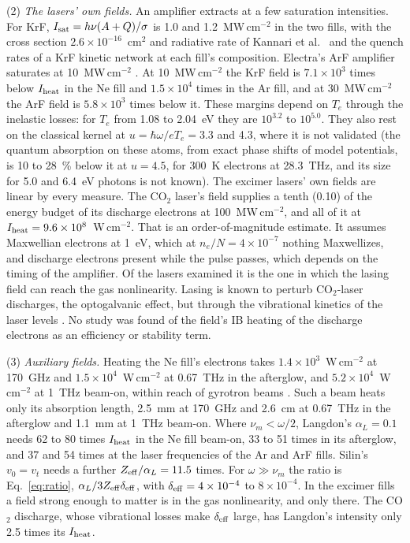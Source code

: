 \documentclass[11pt]{article}
\numberwithin{equation}{section}
\begin{document}
{\noindent}(2) \emph{The lasers' own fields.} An amplifier extracts at a few
saturation intensities. For KrF, $I_{\rm sat}=h\nu(A+Q)/\sigma$ is 1.0 and
1.2~MW\,cm$^{-2}$ in the two fills, with the cross section $2.6\times10^{-16}$~cm$^2$ and
radiative rate of Kannari et al.\ \cite{Kannari1985} and the quench rates of a KrF
kinetic network at each fill's composition. Electra's ArF amplifier
saturates at 10~MW\,cm$^{-2}$ \cite{Obenschain2020}. At 10~MW\,cm$^{-2}$ the KrF field is
$7.1\times10^3$ times below $I_{\rm heat}$ in the Ne fill and $1.5\times10^4$ times in the
Ar fill, and at 30~MW\,cm$^{-2}$ the ArF field is $5.8\times10^3$ times below it. These
margins depend on $T_e$ through the inelastic losses: for $T_e$ from 1.08 to 2.04~eV they
are $10^{3.2}$ to $10^{5.0}$. They also rest on the classical kernel at
$u=\hbar\omega/eT_e=3.3$ and 4.3, where it is not validated (the quantum absorption
on these atoms, from exact phase shifts of model potentials, is 10 to 28~\% below it at
$u=4.5$, for 300~K electrons at 28.3~THz, and its size for 5.0 and 6.4~eV photons
is not known). The excimer lasers' own fields are linear by every measure. The CO$_2$
laser's field supplies a tenth (0.10) of the energy budget of its discharge electrons at
100~MW\,cm$^{-2}$, and all of it at $I_{\rm heat}=9.6\times10^8$~W\,cm$^{-2}$. That is an
order-of-magnitude estimate. It assumes Maxwellian electrons at 1~eV, which at
$n_e/N=4\times10^{-7}$ nothing Maxwellizes, and discharge electrons present while the
pulse passes, which depends on the timing of the amplifier. Of the lasers examined it
is the one in which the lasing field can reach the gas nonlinearity. Lasing is known to perturb CO$_2$-laser
discharges, the optogalvanic effect, but through the vibrational kinetics of the laser levels
\cite{Tachikawa1990}. No study was found of the field's IB heating of the
discharge electrons as an efficiency or stability term.

{\noindent}(3) \emph{Auxiliary fields.} Heating the Ne fill's electrons takes
$1.4\times10^3$~W\,cm$^{-2}$ at 170~GHz and $1.5\times10^4$~W\,cm$^{-2}$ at 0.67~THz
in the afterglow, and $5.2\times10^4$~W\,cm$^{-2}$ at 1~THz beam-on, within reach of
gyrotron beams \cite{Sakamoto2007,Glyavin2012}. Such a beam heats only its absorption length,
2.5~mm at 170~GHz and 2.6~cm at 0.67~THz in the afterglow and 1.1~mm at 1~THz beam-on.
Where $\nu_m<\omega/2$, Langdon's $\alpha_L=0.1$ needs 62 to 80 times $I_{\rm heat}$ in
the Ne fill beam-on, 33 to 51 times in its afterglow, and 37 and 54 times at the laser
frequencies of the Ar and ArF fills. Silin's $v_0=v_t$ needs a further
$Z_{\rm eff}/\alpha_L=11.5$ times. For $\omega\gg\nu_m$ the ratio is
Eq.~\eqref{eq:ratio}, $\alpha_L/3Z_{\rm eff}\delta_{\rm eff}$, with
$\delta_{\rm eff}=4\times10^{-4}$ to $8\times10^{-4}$. In the excimer fills a field strong enough to matter is in the gas
nonlinearity, and only there. The CO$_2$ discharge, whose vibrational losses make
$\delta_{\rm eff}$ large, has Langdon's intensity only 2.5 times its $I_{\rm heat}$.
\end{document}
